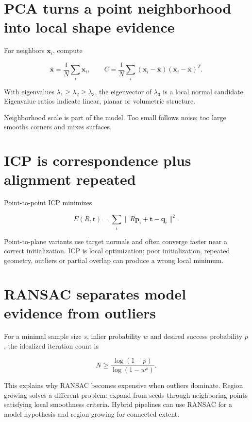\section{PCA turns a point neighborhood into local shape evidence}\label{04-visual-computing-ii-ch035-pca-turns-a-point-neighborhood-into-local-shape-evidence}

For neighbors \(\mathbf x_i\), compute

\[
\bar{\mathbf x}=\frac1N\sum_i\mathbf x_i,
\qquad
C=\frac1N\sum_i(\mathbf x_i-\bar{\mathbf x})(\mathbf x_i-\bar{\mathbf x})^T.
\]

With eigenvalues \(\lambda_1\ge\lambda_2\ge\lambda_3\), the eigenvector of \(\lambda_3\) is a local normal candidate. Eigenvalue ratios indicate linear, planar or volumetric structure.

Neighborhood scale is part of the model. Too small follows noise; too large smooths corners and mixes surfaces.

\section{ICP is correspondence plus alignment repeated}\label{04-visual-computing-ii-ch035-icp-is-correspondence-plus-alignment-repeated}

Point-to-point ICP minimizes

\[
E(R,\mathbf t)=\sum_i\|R\mathbf p_i+\mathbf t-\mathbf q_i\|^2.
\]

Point-to-plane variants use target normals and often converge faster near a correct initialization. ICP is local optimization; poor initialization, repeated geometry, outliers or partial overlap can produce a wrong local minimum.

\section{RANSAC separates model evidence from outliers}\label{04-visual-computing-ii-ch035-ransac-separates-model-evidence-from-outliers}

For a minimal sample size \(s\), inlier probability \(w\) and desired success probability \(p\), the idealized iteration count is

\[
N\ge \frac{\log(1-p)}{\log(1-w^s)}.
\]

This explains why RANSAC becomes expensive when outliers dominate. Region growing solves a different problem: expand from seeds through neighboring points satisfying local smoothness criteria. Hybrid pipelines can use RANSAC for a model hypothesis and region growing for connected extent.

